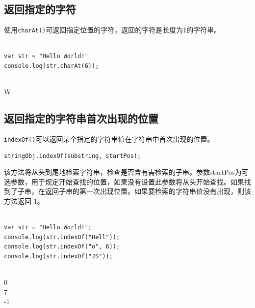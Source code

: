 \subsection{返回指定的字符}

使用\lstinline|charAt()|可返回指定位置的字符，返回的字符是长度为1的字符串。 \\

 \\

\begin{lstlisting}[style=htmlcssjs]
var str = "Hello World!"
console.log(str.charAt(6));
\end{lstlisting}

\begin{tcolorbox}
	 \\
	W
\end{tcolorbox}

\subsection{返回指定的字符串首次出现的位置}

\lstinline|indexOf()|可以返回某个指定的字符串值在字符串中首次出现的位置。 \\

\begin{lstlisting}[style=htmlcssjs]
stringObj.indexOf(substring, startPos);
\end{lstlisting}

该方法将从头到尾地检索字符串，检查是否含有需检索的子串。参数startPos为可选参数，用于规定开始查找的位置，如果没有设置此参数将从头开始查找。如果找到了子串，在返回子串的第一次出现位置。如果要检索的字符串值没有出现，则该方法返回-1。 \\

 \\

\begin{lstlisting}[style=htmlcssjs]
var str = "Hello World!";
console.log(str.indexOf("Hell"));
console.log(str.indexOf("o", 6));
console.log(str.indexOf("JS"));
\end{lstlisting}

\begin{tcolorbox}
	 \\
	0 \\
	7 \\
	-1
\end{tcolorbox}

